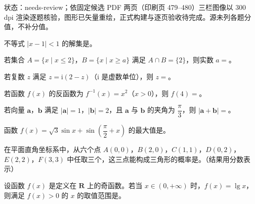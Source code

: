 

状态：needs-review；依固定候选 PDF 两页（印刷页 479–480）三栏图像以 300 dpi 渲染逐题核验，图形已矢量重绘，正式构建与逐页验收待完成。源未列各题分值，不补分值。


\begin{question}
不等式 $|x-1|<1$ 的解集是\gkblank{}。

\end{question}
\begin{question}
若集合 $A=\{x\mid x\leqslant2\}$，$B=\{x\mid x\geqslant a\}$ 满足 $A\cap B=\{2\}$，则实数 $a=$\gkblank{}。

\end{question}
\begin{question}
若复数 $z$ 满足 $z=\mathrm i(2-z)$（$\mathrm i$ 是虚数单位），则 $z=$\gkblank{}。

\end{question}
\begin{question}
若函数 $f(x)$ 的反函数为 $f^{-1}(x)=x^2$（$x>0$），则 $f(4)=$\gkblank{}。

\end{question}
\begin{question}
若向量 $\boldsymbol a$，$\boldsymbol b$ 满足 $|\boldsymbol a|=1$，$|\boldsymbol b|=2$，且 $\boldsymbol a$ 与 $\boldsymbol b$ 的夹角为 $\dfrac{\pi}3$，则 $|\boldsymbol a+\boldsymbol b|=$\gkblank{}。

\end{question}
\begin{question}
函数 $f(x)=\sqrt3\sin x+\sin\left(\dfrac{\pi}2+x\right)$ 的最大值是\gkblank{}。

\end{question}
\begin{question}
在平面直角坐标系中，从六个点 $A(0,0)$，$B(2,0)$，$C(1,1)$，$D(0,2)$，$E(2,2)$，$F(3,3)$ 中任取三个，这三点能构成三角形的概率是\gkblank{}。（结果用分数表示）

\end{question}
\begin{question}
设函数 $f(x)$ 是定义在 $\mathbf R$ 上的奇函数。若当 $x\in(0,+\infty)$ 时，$f(x)=\lg x$，则满足 $f(x)>0$ 的 $x$ 的取值范围是\gkblank{}。

\end{question}
